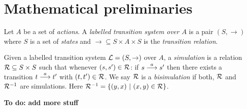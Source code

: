 \section{Mathematical preliminaries}\label{preliminaries}

\begin{definition}
Let $A$ be a set of \emph{actions}.  A \emph{labelled transition
  system over $A$} is a pair $(S, \rightarrow)$ where $S$ is a set of
\emph{states} and $\rightarrow \subseteq S \times A \times S$ is the
\emph{transition relation}.
\end{definition}

\begin{definition}
Given a labelled transition system $\mathcal{L} = (S, \rightarrow)$ over $A$,
a \emph{simulation} is a relation $\mathcal{R} \subseteq S \times S$ such
that whenever $(s, s') \in \mathcal{R}$: if $s \stackrel{a}{\longrightarrow} s'$ then there
exists a transition $t \stackrel{a}{\longrightarrow} t'$ with $(t, t') \in \mathcal{R}$.  We say
$\mathcal{R}$ is a \emph{bisimulation} if both, $\mathcal{R}$ and $\mathcal{R}^{-1}$ are
simulations. Here $\mathcal{R}^{-1} = \{(y, x)\ |\ (x, y) \in \mathcal{R}\}$.
\end{definition}

\NI \textbf{To do: add more stuff}
